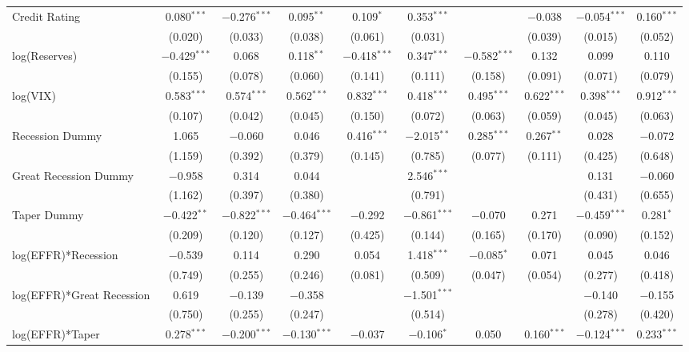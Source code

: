 \documentclass[12pt]{article}
\begin{document}
\begin{landscape}
\begin{table}[!htbp]
\begin{tabular}{@{\extracolsep{5pt}}lccccccccc}
  Credit Rating & 0.080$^{***}$ & $-$0.276$^{***}$ & 0.095$^{**}$ & 0.109$^{*}$ & 0.353$^{***}$ &  & $-$0.038 & $-$0.054$^{***}$ & 0.160$^{***}$ \\ 
  & (0.020) & (0.033) & (0.038) & (0.061) & (0.031) &  & (0.039) & (0.015) & (0.052) \\ 
  log(Reserves) & $-$0.429$^{***}$ & 0.068 & 0.118$^{**}$ & $-$0.418$^{***}$ & 0.347$^{***}$ & $-$0.582$^{***}$ & 0.132 & 0.099 & 0.110 \\ 
  & (0.155) & (0.078) & (0.060) & (0.141) & (0.111) & (0.158) & (0.091) & (0.071) & (0.079) \\ 
  log(VIX) & 0.583$^{***}$ & 0.574$^{***}$ & 0.562$^{***}$ & 0.832$^{***}$ & 0.418$^{***}$ & 0.495$^{***}$ & 0.622$^{***}$ & 0.398$^{***}$ & 0.912$^{***}$ \\ 
  & (0.107) & (0.042) & (0.045) & (0.150) & (0.072) & (0.063) & (0.059) & (0.045) & (0.063) \\ 
  Recession Dummy & 1.065 & $-$0.060 & 0.046 & 0.416$^{***}$ & $-$2.015$^{**}$ & 0.285$^{***}$ & 0.267$^{**}$ & 0.028 & $-$0.072 \\ 
  & (1.159) & (0.392) & (0.379) & (0.145) & (0.785) & (0.077) & (0.111) & (0.425) & (0.648) \\ 
  Great Recession Dummy & $-$0.958 & 0.314 & 0.044 &  & 2.546$^{***}$ &  &  & 0.131 & $-$0.060 \\ 
  & (1.162) & (0.397) & (0.380) &  & (0.791) &  &  & (0.431) & (0.655) \\ 
  Taper Dummy & $-$0.422$^{**}$ & $-$0.822$^{***}$ & $-$0.464$^{***}$ & $-$0.292 & $-$0.861$^{***}$ & $-$0.070 & 0.271 & $-$0.459$^{***}$ & 0.281$^{*}$ \\ 
  & (0.209) & (0.120) & (0.127) & (0.425) & (0.144) & (0.165) & (0.170) & (0.090) & (0.152) \\ 
  log(EFFR)*Recession & $-$0.539 & 0.114 & 0.290 & 0.054 & 1.418$^{***}$ & $-$0.085$^{*}$ & 0.071 & 0.045 & 0.046 \\ 
  & (0.749) & (0.255) & (0.246) & (0.081) & (0.509) & (0.047) & (0.054) & (0.277) & (0.418) \\ 
  log(EFFR)*Great Recession & 0.619 & $-$0.139 & $-$0.358 &  & $-$1.501$^{***}$ &  &  & $-$0.140 & $-$0.155 \\ 
  & (0.750) & (0.255) & (0.247) &  & (0.514) &  &  & (0.278) & (0.420) \\ 
  log(EFFR)*Taper & 0.278$^{***}$ & $-$0.200$^{***}$ & $-$0.130$^{***}$ & $-$0.037 & $-$0.106$^{*}$ & 0.050 & 0.160$^{***}$ & $-$0.124$^{***}$ & 0.233$^{***}$ \\ 

\end{tabular}
\end{table}
\end{landscape}
\end{document}
